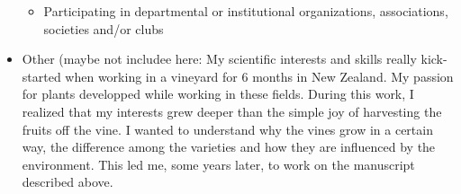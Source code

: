 \documentclass{article}
\begin{document}
\begin{itemize}
\begin{itemize}
        \item Participating in departmental or institutional organizations, associations, societies and/or clubs
    \end{itemize}
    \item Other (maybe not includee here:
    My scientific interests and skills really kick-started when working in a vineyard for 6 months in New Zealand. My passion for plants developped while working in these fields. During this work, I realized that my interests grew deeper than the simple joy of harvesting the fruits off the vine. I wanted to understand why the vines grow in a certain way, the difference among the varieties and how they are influenced by the environment. This led me, some years later, to work on the manuscript described above. 

\end{itemize}


%
\end{document}
